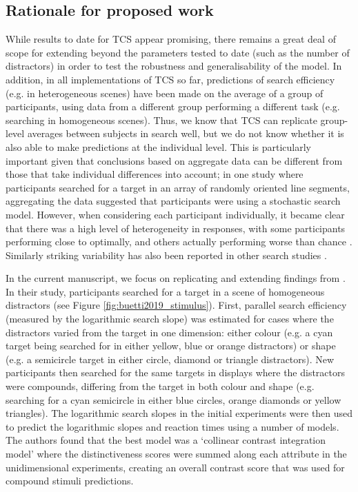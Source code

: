 \documentclass[preprint,12pt,authoryear]{elsarticle}
\begin{document}
\subsection{Rationale for proposed work}

While results to date for TCS appear promising, there remains a great deal of scope for extending beyond the parameters tested to date (such as the number of distractors) in order to test the robustness and generalisability of the model. In addition, in all implementations of TCS so far, predictions of search efficiency (e.g. in heterogeneous scenes) have been made on the average of a group of participants, using data from a different group performing a different task (e.g. searching in homogeneous scenes). Thus, we know that TCS can replicate group-level averages between subjects in search well, but we do not know whether it is also able to make predictions at the individual level. This is particularly important given that conclusions based on aggregate data can be different from those that take individual differences into account; in one study where participants searched for a target in an array of randomly oriented line segments, aggregating the data suggested that participants were using a stochastic search model. However, when considering each participant individually, it became clear that there was a high level of heterogeneity in responses, with some participants performing close to optimally, and others actually performing worse than chance \citep{nowakowska2017human}. Similarly striking variability has also been reported in other search studies \citep{irons2016choosing, irons2018characterizing, clarke2020stable}. 

In the current manuscript, we focus on replicating and extending findings from \cite{buetti2019predicting}. In their study, participants searched for a target in a scene of homogeneous distractors (see Figure \ref{fig:buetti2019_stimulus}). First, parallel search efficiency (measured by the logarithmic search slope) was estimated for cases where the distractors varied from the target in one dimension: either colour (e.g. a cyan target being searched for in either yellow, blue or orange distractors) or shape (e.g. a semicircle target in either circle, diamond or triangle distractors). New participants then searched for the same targets in displays where the distractors were compounds, differing from the target in both colour and shape (e.g. searching for a cyan semicircle in either blue circles, orange diamonds or yellow triangles). The logarithmic search slopes in the initial experiments were then used to predict the logarithmic slopes and reaction times using a number of models. The authors found that the best model was a `collinear contrast integration model' where the distinctiveness scores were summed along each attribute in the unidimensional experiments, creating an overall contrast score that was used for compound stimuli predictions.
\end{document}
